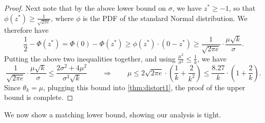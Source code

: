 \begin{proof}
Next note that by the above lower bound on $\sigma$, we have $z^* \ge -1$, so that $\phi(z^*) \ge \frac{1}{\sqrt{2\pi e}}$, where $\phi$ is the PDF of the standard Normal distribution. We therefore have
$$   \frac{1}{2} - \Phi(z^*) = \Phi(0) - \Phi(z^*)  \ge \phi(z^*) \cdot (0 - z^*) \ge \frac{1}{\sqrt{2\pi e}} \cdot \frac{\mu \sqrt{k}}{\sigma}.$$
Putting the above two inequalities together, and using $\frac{\mu^2}{\sigma^2} \le \frac{1}{k}$, we have
$$ \frac{1}{\sqrt{2\pi e}} \cdot\frac{\mu \sqrt{k}}{\sigma} \le \frac{2 \sigma^2 + 4 \mu^2}{\sigma^3 \sqrt{k}} \qquad \Rightarrow \qquad \mu \le 2  \sqrt{2\pi e} \cdot \left(\frac{1}{k} + \frac{2}{k^2}  \right) \le \frac{8.27}{k} \cdot \left(1 + \frac{2}{k}\right).$$
Since $\theta_k = \mu$, plugging this bound into \cref{thm:distort1}, the proof of the upper bound is complete.
\end{proof}

We now show a matching lower bound, showing our analysis is tight.

